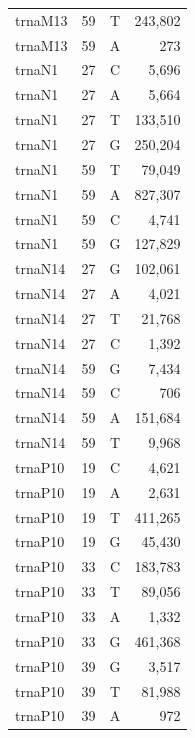 \documentclass[12pt]{rockefeller}
\begin{document}
{\begin{center}
\begin{supertabular}{|l|r|c|r|}
 trnaM13 &        59 &          T &    243,802 \\
 trnaM13 &        59 &          A &        273 \\
  trnaN1 &        27 &          C &      5,696 \\
  trnaN1 &        27 &          A &      5,664 \\
  trnaN1 &        27 &          T &    133,510 \\
  trnaN1 &        27 &          G &    250,204 \\
  trnaN1 &        59 &          T &     79,049 \\
  trnaN1 &        59 &          A &    827,307 \\
  trnaN1 &        59 &          C &      4,741 \\
  trnaN1 &        59 &          G &    127,829 \\
 trnaN14 &        27 &          G &    102,061 \\
 trnaN14 &        27 &          A &      4,021 \\
 trnaN14 &        27 &          T &     21,768 \\
 trnaN14 &        27 &          C &      1,392 \\
 trnaN14 &        59 &          G &      7,434 \\
 trnaN14 &        59 &          C &        706 \\
 trnaN14 &        59 &          A &    151,684 \\
 trnaN14 &        59 &          T &      9,968 \\
 trnaP10 &        19 &          C &      4,621 \\
 trnaP10 &        19 &          A &      2,631 \\
 trnaP10 &        19 &          T &    411,265 \\
 trnaP10 &        19 &          G &     45,430 \\
 trnaP10 &        33 &          C &    183,783 \\
 trnaP10 &        33 &          T &     89,056 \\
 trnaP10 &        33 &          A &      1,332 \\
 trnaP10 &        33 &          G &    461,368 \\
 trnaP10 &        39 &          G &      3,517 \\
 trnaP10 &        39 &          T &     81,988 \\
 trnaP10 &        39 &          A &        972 \\

\end{supertabular}
\end{center}}
\end{document}
